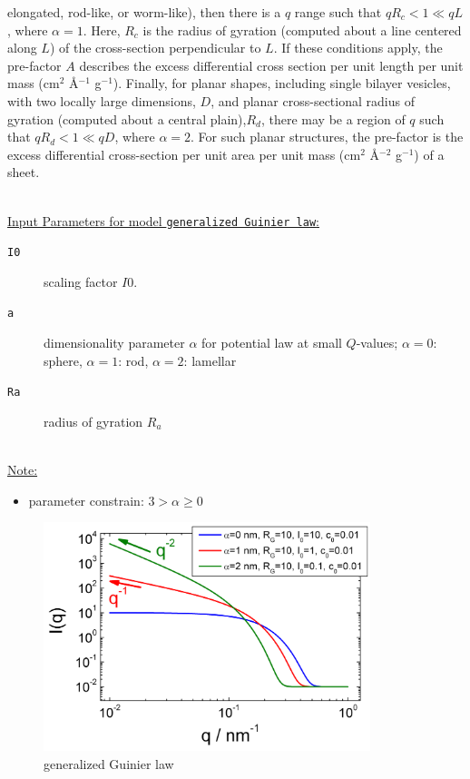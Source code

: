 elongated, rod-like, or worm-like), then there is a $q$ range such
that $qR_c < 1 \ll qL$, where $\alpha = 1$. Here, $R_c$ is the
radius of gyration (computed about a line centered along $L$) of the
cross-section perpendicular to $L$. If these conditions apply, the
pre-factor $A$ describes the excess differential cross section per
unit length per unit mass (cm$^2$ \AA$^{-1}$ g$^{-1}$). Finally, for
planar shapes, including single bilayer vesicles, with two locally
large dimensions, $D$, and planar cross-sectional radius of gyration
(computed about a central plain),$R_d$, there may be a region of $q$
such that $qR_d < 1 \ll qD$, where $\alpha = 2$. For such planar
structures, the pre-factor is the excess differential cross-section
per unit area per unit mass (cm$^2$ \AA$^{-2}$ g$^{-1}$) of a sheet.

\newpage
\hspace{1pt}\\
\underline{Input Parameters for model \texttt{generalized Guinier law}:}\\
\begin{description}
\item[\texttt{I0}] scaling factor $I0$.
\item[\texttt{a}]  dimensionality parameter $\alpha$ for potential law at small
     $Q$-values; $\alpha=0$: sphere, $\alpha=1$: rod, $\alpha=2$: lamellar
\item[\texttt{Ra}] radius of gyration $R_{a}$
\end{description}

\hspace{1pt}\\
\underline{Note:}
\begin{itemize}
\item parameter constrain: $3>\alpha\geq 0$
\end{itemize}

\begin{figure}[htb]
\begin{center}
\includegraphics[width=0.85\textwidth]{generalizedGuinierIq.png}
\end{center}
\caption{generalized Guinier law} \label{fig:generalizedGuinierIq}
\end{figure}

